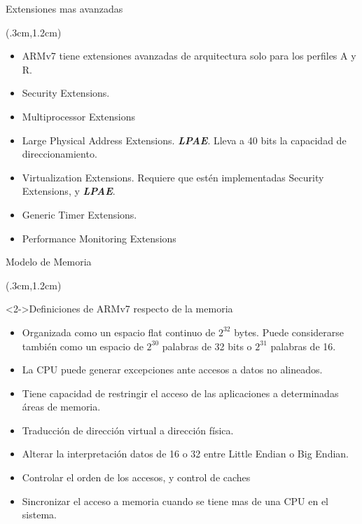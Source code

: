 \documentclass[usenames,table,dvipsnames,aspectratio=169]{beamer}
\begin{document}
\begin{frame}{Extensiones mas avanzadas}
 \begin{textblock*}{\textwidth}(.3cm,1.2cm)
  \begin{itemize}[<+(1)->] \justifying \parskip 0.3cm
   \item ARMv7 tiene  extensiones avanzadas de arquitectura solo para los perfiles A y R.
   \item Security Extensions.
   \item Multiprocessor Extensions
   \item Large Physical Address Extensions. \textbf{\textit{LPAE}}. Lleva a 40 bits la capacidad de direccionamiento.
   \item Virtualization Extensions. Requiere que estén implementadas Security Extensions, y \textbf{\textit{LPAE}}.
   \item Generic Timer Extensions.
   \item Performance Monitoring Extensions
  \end{itemize}
 \end{textblock*}
\end{frame}

\begin{frame}{Modelo de Memoria}
 \begin{textblock*}{\textwidth}(.3cm,1.2cm)
  \begin{block}<2->{Definiciones de ARMv7 respecto de la memoria}
   \begin{itemize}[<+(2)->]\justifying
    \item Organizada como un espacio flat continuo de $2^{32}$ bytes. Puede considerarse también como un espacio de $2^{30}$ palabras de 32 bits o $2^{31}$ palabras de \SI{16}{\bit}.
    \item La CPU puede generar excepciones ante accesos a datos no alineados.
    \item Tiene capacidad de restringir el acceso de las aplicaciones a determinadas áreas de memoria.
    \item Traducción de dirección virtual a dirección física.
    \item Alterar la interpretación datos de \SI{16}{\bit} o \SI{32}{\bit} entre Little Endian o Big Endian.
    \item Controlar el orden de los accesos, y control de caches
    \item Sincronizar el acceso a memoria cuando se tiene mas de una CPU en el sistema.
   \end{itemize}
  \end{block}
 \end{textblock*}
\end{frame}
\end{document}
